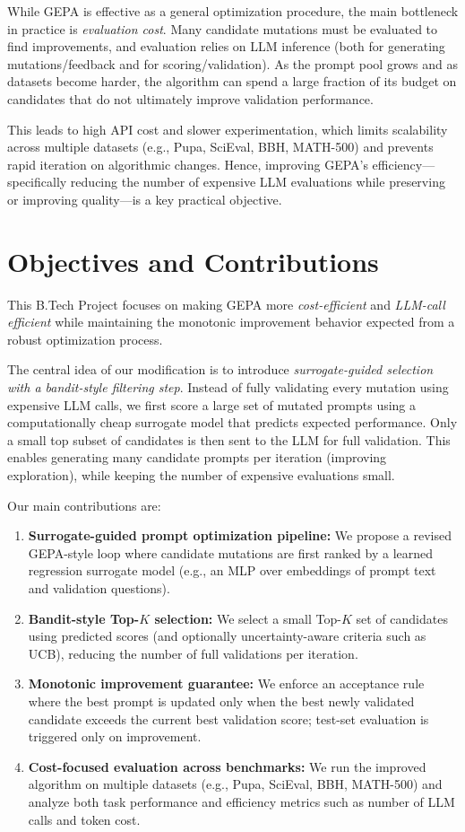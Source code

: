 While GEPA is effective as a general optimization procedure, the main bottleneck in practice is \emph{evaluation cost}. Many candidate mutations must be evaluated to find improvements, and evaluation relies on LLM inference (both for generating mutations/feedback and for scoring/validation). As the prompt pool grows and as datasets become harder, the algorithm can spend a large fraction of its budget on candidates that do not ultimately improve validation performance.

This leads to high API cost and slower experimentation, which limits scalability across multiple datasets (e.g., Pupa, SciEval, BBH, MATH-500) and prevents rapid iteration on algorithmic changes. Hence, improving GEPA's efficiency---specifically reducing the number of expensive LLM evaluations while preserving or improving quality---is a key practical objective.

\section{Objectives and Contributions}
This B.Tech Project focuses on making GEPA more \emph{cost-efficient} and \emph{LLM-call efficient} while maintaining the monotonic improvement behavior expected from a robust optimization process.

The central idea of our modification is to introduce \emph{surrogate-guided selection with a bandit-style filtering step}. Instead of fully validating every mutation using expensive LLM calls, we first score a large set of mutated prompts using a computationally cheap surrogate model that predicts expected performance. Only a small top subset of candidates is then sent to the LLM for full validation. This enables generating many candidate prompts per iteration (improving exploration), while keeping the number of expensive evaluations small.

Our main contributions are:
\begin{enumerate}
    \item \textbf{Surrogate-guided prompt optimization pipeline:} We propose a revised GEPA-style loop where candidate mutations are first ranked by a learned regression surrogate model (e.g., an MLP over embeddings of prompt text and validation questions).
    \item \textbf{Bandit-style Top-$K$ selection:} We select a small Top-$K$ set of candidates using predicted scores (and optionally uncertainty-aware criteria such as UCB), reducing the number of full validations per iteration.
    \item \textbf{Monotonic improvement guarantee:} We enforce an acceptance rule where the best prompt is updated only when the best newly validated candidate exceeds the current best validation score; test-set evaluation is triggered only on improvement.
    \item \textbf{Cost-focused evaluation across benchmarks:} We run the improved algorithm on multiple datasets (e.g., Pupa, SciEval, BBH, MATH-500) and analyze both task performance and efficiency metrics such as number of LLM calls and token cost.
\end{enumerate}

